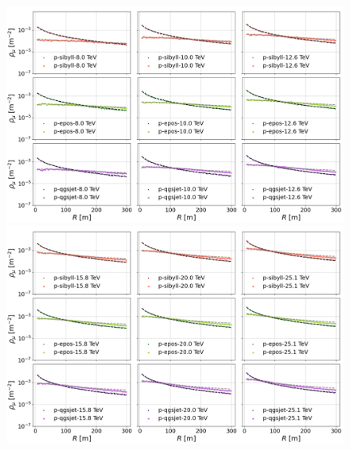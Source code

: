 \begin{figure}
	\includegraphics[width=\textwidth]{Figuras/lateraldist_wfits_10-12.png}
	\includegraphics[width=\textwidth]{Figuras/lateraldist_wfits_13-15.png}
\end{figure}

